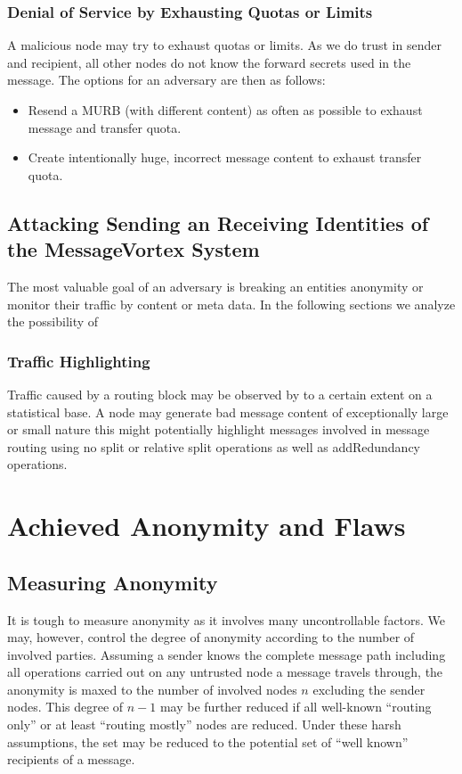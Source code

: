 \subsubsection{Denial of Service by Exhausting Quotas or Limits}
A malicious node may try to exhaust quotas or limits. As we do trust in sender and recipient, all other nodes do not know the forward secrets used in the message. The options for an adversary are then as follows:

\begin{itemize}
	\item Resend a MURB (with different content) as often as possible to exhaust message and transfer quota.
	\item Create intentionally huge, incorrect message content to exhaust transfer quota.
\end{itemize}

\subsection{Attacking Sending an Receiving Identities of the MessageVortex System}
The most valuable goal of an adversary is breaking an entities anonymity or monitor their traffic by content or meta data. In the following sections we analyze the possibility of 


\subsubsection{Traffic Highlighting}
Traffic caused by a routing block may be observed by to a certain extent on a statistical base. A node may generate bad message content of exceptionally large or small nature this might potentially highlight messages involved in message routing using no split or relative split operations as well as addRedundancy operations.

\section{Achieved Anonymity and Flaws}
\subsection{Measuring Anonymity}
It is tough to measure anonymity as it involves many uncontrollable factors. We may, however, control the degree of anonymity according to the number of involved parties. Assuming a sender knows the complete message path including all operations carried out on any untrusted node a message travels through, the anonymity is maxed to the number of involved nodes $n$ excluding the sender nodes. This degree of $n-1$ may be further reduced if all well-known ``routing only'' or at least ``routing mostly'' nodes are reduced. Under these harsh assumptions, the set may be reduced to the potential set of ``well known'' recipients of a message.


